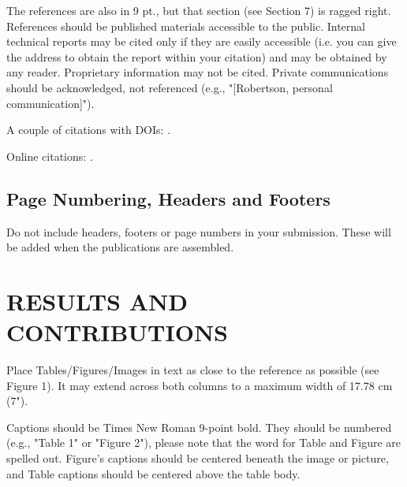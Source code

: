 \documentclass[sigconf]{acmart}
\begin{document}
The references are also in 9 pt., but that section (see Section 7) is
ragged right. References should be published materials accessible
to the public. Internal technical reports may be cited only if they
are easily accessible (i.e. you can give the address to obtain the
report within your citation) and may be obtained by any reader.
Proprietary information may not be cited. Private communications
should be acknowledged, not referenced (e.g., "[Robertson,
personal communication]").

A couple of citations with DOIs: \cite{2004:ITE:1009386.1010128,
  Kirschmer:2010:AEI:1958016.1958018}. 

Online citations: \cite{TUGInstmem, Thornburg01, CTANacmart}.  

\subsection*{Page Numbering, Headers and Footers}
Do not include headers, footers or page numbers in your
submission. These will be added when the publications are
assembled.

\section*{RESULTS AND CONTRIBUTIONS}
Place Tables/Figures/Images in text as close to the reference as
possible (see Figure 1). It may extend across both columns to a
maximum width of 17.78 cm (7").

Captions should be Times New Roman 9-point bold. They should
be numbered (e.g., "Table 1" or "Figure 2"), please note that the
word for Table and Figure are spelled out. Figure's captions should be centered beneath the image or picture, and Table captions should be centered above the table body.


 
\end{document}
